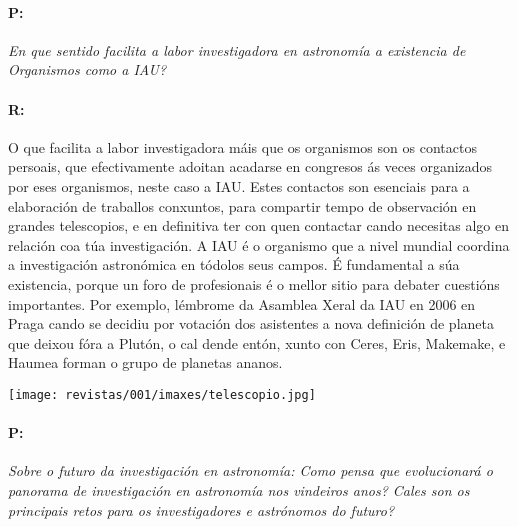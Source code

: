 \begin{multicols}{2}
\paragraph{P:}

\textit{ En que sentido facilita a labor investigadora en astronomía a
existencia de Organismos como a IAU? }

\paragraph{R:}

O que facilita a labor investigadora máis que os organismos son os contactos
persoais, que efectivamente adoitan acadarse en congresos ás veces organizados
por eses organismos, neste caso a IAU. Estes contactos son esenciais para a
elaboración de traballos conxuntos, para compartir tempo de observación en
grandes telescopios, e en definitiva ter con quen contactar cando necesitas
algo en relación coa túa investigación. A IAU é o organismo que a nivel mundial
coordina a investigación astronómica en tódolos seus campos. É fundamental a
súa existencia, porque un foro de profesionais é o mellor sitio para debater
cuestións importantes. Por exemplo, lémbrome da Asamblea Xeral da IAU en 2006
en Praga cando se decidiu por votación dos asistentes a nova definición de
planeta que deixou fóra a Plutón, o cal dende entón, xunto con Ceres, Eris,
Makemake, e Haumea forman o grupo de planetas ananos.

\begin{center}
    \texttt{[image: revistas/001/imaxes/telescopio.jpg]}
\end{center}

\paragraph{P:}

\textit{ Sobre o futuro da investigación en astronomía: Como pensa que
evolucionará o panorama de investigación en astronomía nos vindeiros anos?
Cales son os principais retos para os investigadores e astrónomos do futuro? }


\end{multicols}
